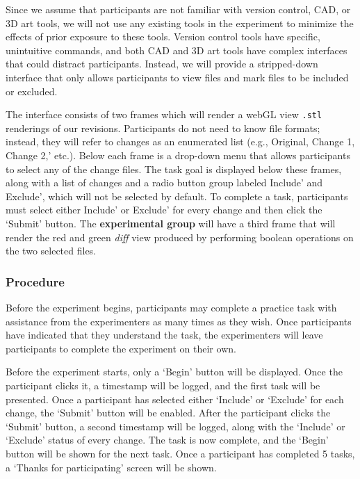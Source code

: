 \documentclass[sigconf,authorversion,nonacm]{acmart}
\begin{document}
Since we assume that participants are not familiar with version control, CAD, or 3D art tools, we will not use any existing tools in the experiment to minimize the effects of prior exposure to these tools. 
Version control tools have specific, unintuitive commands, and both CAD and 3D art tools have complex interfaces that could distract participants. 
Instead, we will provide a stripped-down interface that only allows participants to view files and mark files to be included or excluded.

The interface consists of two frames which will render a webGL view \texttt{.stl} renderings of our revisions.
Participants do not need to know file formats; instead, they will refer to changes as an enumerated list (e.g., Original, Change 1, Change 2,' etc.).
Below each frame is a drop-down menu that allows participants to select any of the change files. 
The task goal is displayed below these frames, along with a list of changes and a radio button group labeled Include' and Exclude', which will not be selected by default. 
To complete a task, participants must select either Include' or Exclude' for every change and then click the `Submit' button. 
The \textbf{experimental group} will have a third frame that will render the red and green \emph{diff} view produced by performing boolean operations on the two selected files.


\subsubsection{Procedure}

Before the experiment begins, participants may complete a practice task with assistance from the experimenters as many times as they wish. 
Once participants have indicated that they understand the task, the experimenters will leave participants to complete the experiment on their own.

Before the experiment starts, only a `Begin' button will be displayed.
Once the participant clicks it, a timestamp will be logged, and the first task will be presented.
Once a participant has selected either `Include' or `Exclude' for each change, the `Submit' button will be enabled.
After the participant clicks the `Submit' button, a second timestamp will be logged, along with the `Include' or `Exclude' status of every change.
The task is now complete, and the `Begin' button will be shown for the next task.
Once a participant has completed 5 tasks, a `Thanks for participating' screen will be shown.
\end{document}
